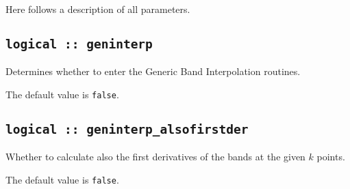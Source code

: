 Here follows a description of all parameters.

\subsection[boltzwann]{\tt logical :: geninterp}
Determines whether to enter the Generic Band Interpolation routines.

The default value is \verb#false#.

\subsection[geninterp\_alsofirstder]{\tt logical :: geninterp\_alsofirstder}
Whether to calculate also the first derivatives of the bands at the
given $k$ points.

The default value is \verb#false#.

